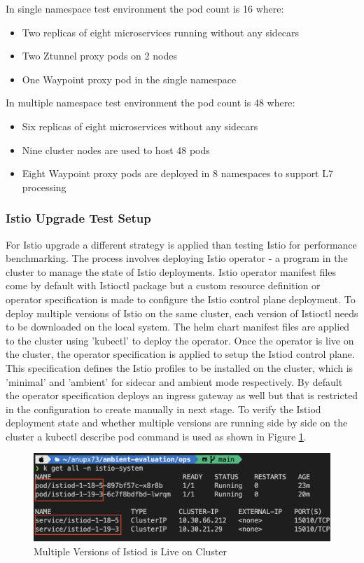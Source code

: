 In single namespace test environment the pod count is 16 where:
\begin{itemize}
  \item Two replicas of eight microservices running without any sidecars
  \item Two Ztunnel proxy pods on 2 nodes
  \item One Waypoint proxy pod in the single namespace
\end{itemize}

In multiple namespace test environment the pod count is 48 where:
\begin{itemize}
  \item Six replicas of eight microservices without any sidecars
  \item Nine cluster nodes are used to host 48 pods
  \item Eight Waypoint proxy pods are deployed in 8 namespaces to support L7 processing
\end{itemize}

\subsubsection{Istio Upgrade Test Setup}
For Istio upgrade a different strategy is applied than testing Istio for performance benchmarking. The process involves deploying Istio operator - a program in the cluster to manage the state of Istio deployments. Istio operator manifest files come by default with Istioctl package but a custom resource definition or operator specification is made to configure the Istio control plane deployment. To deploy multiple versions of Istio on the same cluster, each version of Istioctl needs to be downloaded on the local system. The helm chart manifest files are applied to the cluster using 'kubectl' to deploy the operator. Once the operator is live on the cluster, the operator specification is applied to setup the Istiod control plane. This specification defines the Istio profiles to be installed on the cluster, which is 'minimal' and 'ambient' for sidecar and ambient mode respectively. By default the operator specification deploys an ingress gateway as well but that is restricted in the configuration to create manually in next stage. To verify the Istiod deployment state and whether multiple versions are running side by side on the cluster a kubectl describe pod command is used as shown in Figure \ref{method:multiIstiodVersions}.

\begin{figure}[ht!]
  \centering
  \includegraphics[width=1.0\linewidth]{resources/multi-istiod.png}
  \caption{Multiple Versions of Istiod is Live on Cluster}
  \label{method:multiIstiodVersions}
\end{figure}

